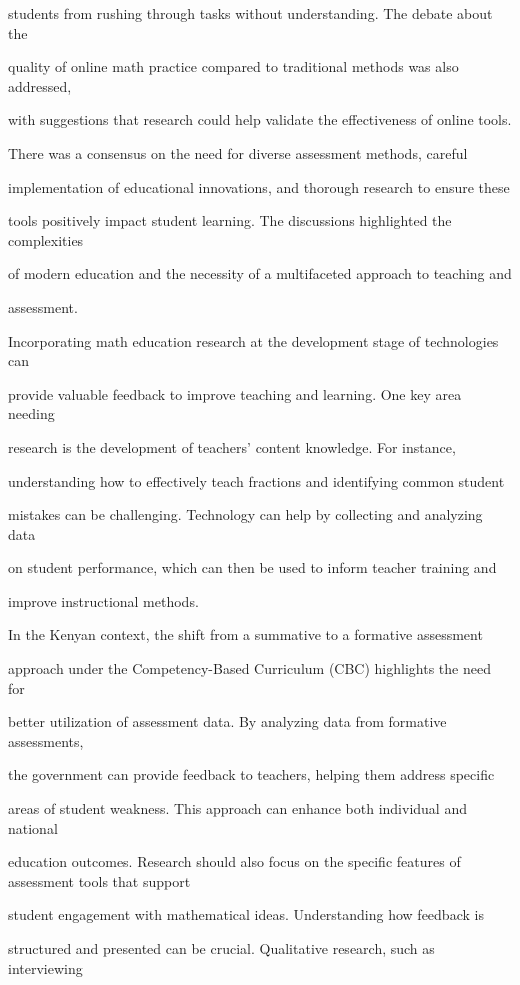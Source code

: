 \documentclass[11pt]{article}
\begin{document}
students from rushing through tasks without understanding. The debate about the

quality of online math practice compared to traditional methods was also addressed,

with suggestions that research could help validate the effectiveness of online tools.

There was a consensus on the need for diverse assessment methods, careful

implementation of educational innovations, and thorough research to ensure these

tools positively impact student learning. The discussions highlighted the complexities

of modern education and the necessity of a multifaceted approach to teaching and

assessment.

Incorporating math education research at the development stage of technologies can

provide valuable feedback to improve teaching and learning. One key area needing

research is the development of teachers' content knowledge. For instance,

understanding how to effectively teach fractions and identifying common student

mistakes can be challenging. Technology can help by collecting and analyzing data

on student performance, which can then be used to inform teacher training and

improve instructional methods.

In the Kenyan context, the shift from a summative to a formative assessment

approach under the Competency-Based Curriculum (CBC) highlights the need for

better utilization of assessment data. By analyzing data from formative assessments,

the government can provide feedback to teachers, helping them address specific

areas of student weakness. This approach can enhance both individual and national

education outcomes. Research should also focus on the specific features of assessment tools that support

student engagement with mathematical ideas. Understanding how feedback is

structured and presented can be crucial. Qualitative research, such as interviewing
\end{document}
